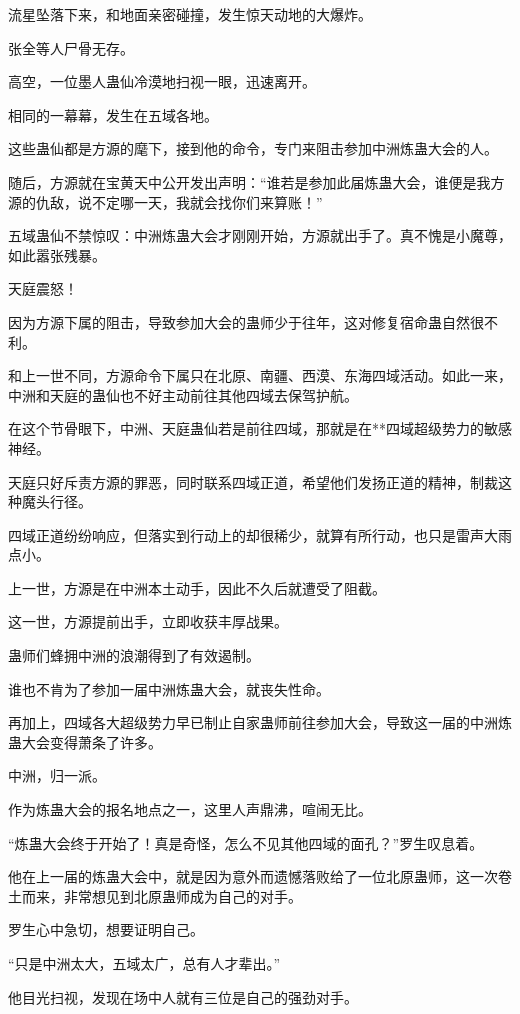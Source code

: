 \begin{this_body}
流星坠落下来，和地面亲密碰撞，发生惊天动地的大爆炸。

张全等人尸骨无存。

高空，一位墨人蛊仙冷漠地扫视一眼，迅速离开。

相同的一幕幕，发生在五域各地。

这些蛊仙都是方源的麾下，接到他的命令，专门来阻击参加中洲炼蛊大会的人。

随后，方源就在宝黄天中公开发出声明：“谁若是参加此届炼蛊大会，谁便是我方源的仇敌，说不定哪一天，我就会找你们来算账！”

五域蛊仙不禁惊叹：中洲炼蛊大会才刚刚开始，方源就出手了。真不愧是小魔尊，如此嚣张残暴。

天庭震怒！

因为方源下属的阻击，导致参加大会的蛊师少于往年，这对修复宿命蛊自然很不利。

和上一世不同，方源命令下属只在北原、南疆、西漠、东海四域活动。如此一来，中洲和天庭的蛊仙也不好主动前往其他四域去保驾护航。

在这个节骨眼下，中洲、天庭蛊仙若是前往四域，那就是在**四域超级势力的敏感神经。

天庭只好斥责方源的罪恶，同时联系四域正道，希望他们发扬正道的精神，制裁这种魔头行径。

四域正道纷纷响应，但落实到行动上的却很稀少，就算有所行动，也只是雷声大雨点小。

上一世，方源是在中洲本土动手，因此不久后就遭受了阻截。

这一世，方源提前出手，立即收获丰厚战果。

蛊师们蜂拥中洲的浪潮得到了有效遏制。

谁也不肯为了参加一届中洲炼蛊大会，就丧失性命。

再加上，四域各大超级势力早已制止自家蛊师前往参加大会，导致这一届的中洲炼蛊大会变得萧条了许多。

中洲，归一派。

作为炼蛊大会的报名地点之一，这里人声鼎沸，喧闹无比。

“炼蛊大会终于开始了！真是奇怪，怎么不见其他四域的面孔？”罗生叹息着。

他在上一届的炼蛊大会中，就是因为意外而遗憾落败给了一位北原蛊师，这一次卷土而来，非常想见到北原蛊师成为自己的对手。

罗生心中急切，想要证明自己。

“只是中洲太大，五域太广，总有人才辈出。”

他目光扫视，发现在场中人就有三位是自己的强劲对手。


\end{this_body}
